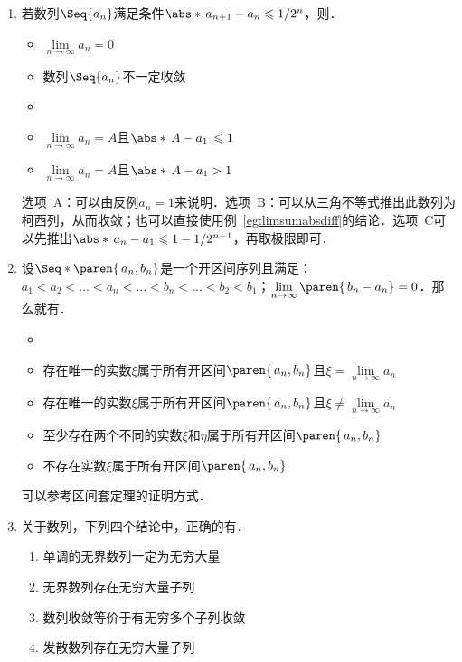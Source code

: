 \begin{enumerate}
\item 若数列\(\Seq{a_n}\)满足条件\(\abs*{\,a_{n+1} - a_n} \le 1/2^n\)，则\uline{\makebox[6em]{}}．
  \begin{itemize}
    \renewcommand{\labelitemi}{\faCircleThin}
  \item \(\lim\limits_{n\to\infty} a_n = 0\)
  \item 数列\(\Seq{a_n}\)不一定收敛
    \ifshowsol
    \item[\faCircle]
    \else
    \item
    \fi
    \(\lim\limits_{n\to\infty} a_n = A\)且\(\abs*{\,A - a_1\,} \le 1\)
  \item \(\lim\limits_{n\to\infty} a_n = A\)且\(\abs*{\,A - a_1} > 1\)
  \end{itemize}

  \ifshowsol
    选项~A：可以由反例\(a_n = 1\)来说明．选项~B：可以从三角不等式推出此数列为柯西列，从而收敛；也可以直接使用例~\ref{eg:limsumabsdiff}的结论．选项~C可以先推出\(\abs*{\,a_n - a_1} \le 1 - 1/2^{n-1}\)，再取极限即可．
  \fi

\item 设\(\Seq*{\paren{\,a_n, b_n}}\)是一个开区间序列且满足：\(a_1 < a_2 < \dots < a_n < \dots < b_n < \dots < b_2 < b_1\)；\(\lim\limits_{n\to\infty} \paren{\,b_n - a_n} = 0\)．那么就有\uline{\makebox[10em]{}}．
  \begin{itemize}
    \renewcommand{\labelitemi}{\faCircleThin}
    \ifshowsol
    \item[\faCircle]
    \else
    \item
    \fi
    存在唯一的实数\(ξ\)属于所有开区间\(\paren{\,a_n, b_n}\)且\(ξ = \lim\limits_{n\to\infty} a_n\)
  \item 存在唯一的实数\(ξ\)属于所有开区间\(\paren{\,a_n, b_n}\)且\(ξ \ne \lim\limits_{n\to\infty} a_n\)
  \item 至少存在两个不同的实数\(ξ\)和\(η\)属于所有开区间\(\paren{\,a_n, b_n}\)
  \item 不存在实数\(ξ\)属于所有开区间\(\paren{\,a_n, b_n}\)
  \end{itemize}

  \ifshowsol
    可以参考区间套定理的证明方式．
  \fi

\item 关于数列，下列四个结论中，正确的有\uline{}．
  \begin{enumerate}
    \renewcommand{\labelenumii}{\enumparen{\arabic{enumii}}}
  \item 单调的无界数列一定为无穷大量
  \item 无界数列存在无穷大量子列
  \item 数列收敛等价于有无穷多个子列收敛
  \item 发散数列存在无穷大量子列
  \end{enumerate}


\end{enumerate}
